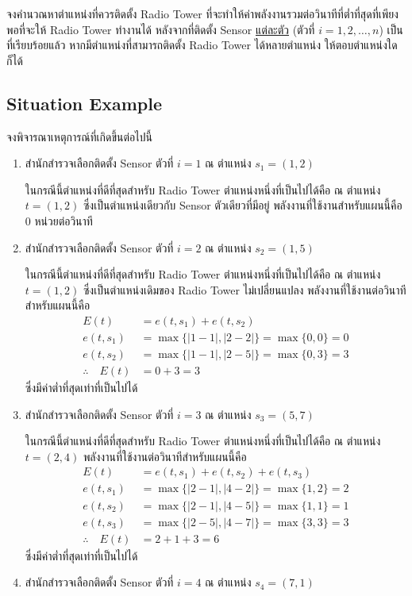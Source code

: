 จงคำนวณหาตำแหน่งที่ควรติดตั้ง Radio Tower ที่จะทำให้ค่าพลังงานรวมต่อวินาทีที่ต่ำที่สุดที่เพียงพอที่จะให้ Radio Tower ทำงานได้ หลังจากที่ติดตั้ง Sensor \uline{แต่ละตัว} (ตัวที่ $i = 1, 2, \ldots, n$) เป็นที่เรียบร้อยแล้ว \;
หากมีตำแหน่งที่สามารถติดตั้ง Radio Tower ได้หลายตำแหน่ง ให้ตอบตำแหน่งใดก็ได้


\newpage
{}
\subsection{Situation Example}

\noindent
จงพิจารณาเหตุการณ์ที่เกิดขึ้นต่อไปนี้

\begin{enumerate}
    \item
        สำนักสำรวจเลือกติดตั้ง Sensor ตัวที่ $i = 1$ ณ ตำแหน่ง $s_1 = (1, 2)$

        ในกรณีนี้ตำแหน่งที่ดีที่สุดสำหรับ Radio Tower ตำแหน่งหนึ่งที่เป็นไปได้คือ ณ ตำแหน่ง $t = (1, 2)$ ซึ่งเป็นตำแหน่งเดียวกับ Sensor ตัวเดียวที่มีอยู่ \; พลังงานที่ใช้งานสำหรับแผนนี้คือ 0 หน่วยต่อวินาที
    \item
        สำนักสำรวจเลือกติดตั้ง Sensor ตัวที่ $i = 2$ ณ ตำแหน่ง $s_2 = (1, 5)$

        ในกรณีนี้ตำแหน่งที่ดีที่สุดสำหรับ Radio Tower ตำแหน่งหนึ่งที่เป็นไปได้คือ ณ ตำแหน่ง $t = (1, 2)$ ซึ่งเป็นตำแหน่งเดิมของ Radio Tower ไม่เปลี่ยนแปลง \; พลังงานที่ใช้งานต่อวินาทีสำหรับแผนนี้คือ
        \begin{align*}
            E(t) &= e(t, s_1) + e(t, s_2) \\
            e(t, s_1) &= \max\{|1 - 1|, |2 - 2|\} = \max\{0, 0\} = 0 \\
            e(t, s_2) &= \max\{|1 - 1|, |2 - 5|\} = \max\{0, 3\} = 3 \\
            \therefore\quad E(t) &= 0 + 3 = 3
        \end{align*}
        ซึ่งมีค่าต่ำที่สุดเท่าที่เป็นไปได้
    \item
        สำนักสำรวจเลือกติดตั้ง Sensor ตัวที่ $i = 3$ ณ ตำแหน่ง $s_3 = (5, 7)$

        ในกรณีนี้ตำแหน่งที่ดีที่สุดสำหรับ Radio Tower ตำแหน่งหนึ่งที่เป็นไปได้คือ ณ ตำแหน่ง $t = (2, 4)$ \; พลังงานที่ใช้งานต่อวินาทีสำหรับแผนนี้คือ
        \begin{align*}
            E(t) &= e(t, s_1) + e(t, s_2) + e(t, s_3) \\
            e(t, s_1) &= \max\{|2 - 1|, |4 - 2|\} = \max\{1, 2\} = 2 \\
            e(t, s_2) &= \max\{|2 - 1|, |4 - 5|\} = \max\{1, 1\} = 1 \\
            e(t, s_3) &= \max\{|2 - 5|, |4 - 7|\} = \max\{3, 3\} = 3 \\
            \therefore\quad E(t) &= 2 + 1 + 3 = 6
        \end{align*}
        ซึ่งมีค่าต่ำที่สุดเท่าที่เป็นไปได้
    \item
        สำนักสำรวจเลือกติดตั้ง Sensor ตัวที่ $i = 4$ ณ ตำแหน่ง $s_4 = (7, 1)$


\end{enumerate}

